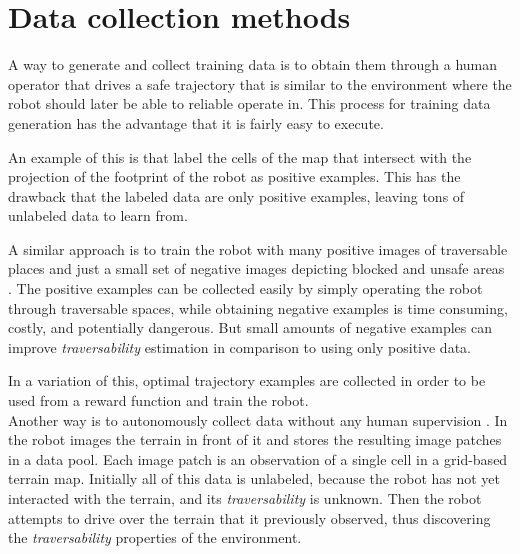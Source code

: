 \documentclass[12pt,a4paper]{report}
\newcommand{\term}{\textit}
\begin{document}
	\section{Data collection methods}
	\label{sec:bg:data}
	
	A way to generate and collect training data is to obtain them through a human 
	operator that drives a safe trajectory that is similar to the environment where 
	the robot should later be able to reliable operate in. This process for training 
	data generation has the advantage that it is fairly easy to execute.
	\par 
	An example of this is \cite{Suger} that label the cells of the map that 
	intersect with the projection of the footprint of the robot as positive examples. 
	This has the drawback that the labeled data are only positive examples, leaving 
	tons of unlabeled data to learn from.
	\par
	A similar approach is to train the robot with many positive images of traversable 
	places and just a small set of negative	images depicting blocked and unsafe areas 
	\cite{HiroseGonet}. The positive examples can be collected easily by simply 
	operating the robot through traversable spaces, while obtaining negative examples 
	is time consuming, costly, and potentially dangerous. But small amounts of 
	negative examples can improve \term{traversability} estimation in comparison to 
	using only positive data.
	\par 
	In a variation of this, optimal trajectory examples are collected \cite{Wigness} 
	in order to be used from a reward function and train the robot.
	\\
	
	Another way is to autonomously collect data without any human supervision 
	\cite{Kim, Lee}. In \cite{Kim} the robot images the terrain in front of it and 
	stores the resulting image patches in a data pool. Each image patch is an 
	observation of a single cell in a grid-based terrain map. Initially all of this 
	data is unlabeled, because the robot has not yet interacted with the terrain, and 
	its \term{traversability} is unknown. Then the robot attempts to drive over the 
	terrain that it previously observed, thus discovering the \term{traversability} 
	properties of the environment.
	\\\\
	
\end{document}
